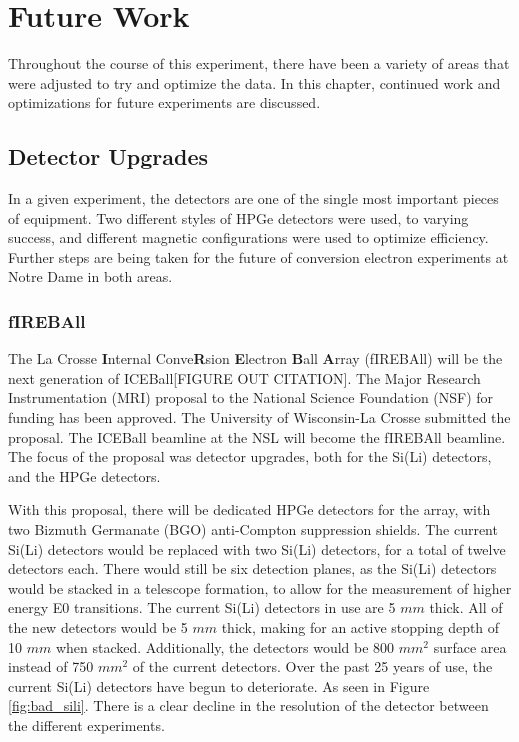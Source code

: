 
%
%

\chapter{Future Work}

Throughout the course of this experiment, there have been a variety of areas that were adjusted to try and optimize the data. In this chapter, continued work and optimizations for future experiments are discussed.

\section{Detector Upgrades}

In a given experiment, the detectors are one of the single most important pieces of equipment. Two different styles of HPGe detectors were used, to varying success, and different magnetic configurations were used to optimize efficiency. Further steps are being taken for the future of conversion electron experiments at Notre Dame in both areas.

\subsection{fIREBAll}

The La Crosse \textbf{I}nternal Conve\textbf{R}sion \textbf{E}lectron \textbf{B}all \textbf{A}rray (fIREBAll) will be the next generation of ICEBall[FIGURE OUT CITATION]. The Major Research Instrumentation (MRI) proposal to the National Science Foundation (NSF) for funding has been approved. The University of Wisconsin-La Crosse submitted the proposal. The ICEBall beamline at the NSL will become the fIREBAll beamline. The focus of the proposal was detector upgrades, both for the Si(Li) detectors, and the HPGe detectors.

With this proposal, there will be dedicated HPGe detectors for the array, with two Bizmuth Germanate (BGO) anti-Compton suppression shields. The current Si(Li) detectors would be replaced with two Si(Li) detectors, for a total of twelve detectors each. There would still be six detection planes, as the Si(Li) detectors would be stacked in a telescope formation, to allow for the measurement of higher energy E0 transitions. The current Si(Li) detectors in use are 5 $mm$ thick. All of the new detectors would be 5 $mm$ thick, making for an active stopping depth of 10 $mm$ when stacked. Additionally, the detectors would be 800 $mm^2$ surface area instead of 750 $mm^2$ of the current detectors. Over the past 25 years of use, the current Si(Li) detectors have begun to deteriorate. As seen in Figure \ref{fig:bad_sili}. There is a clear decline in the resolution of the detector between the different experiments.

